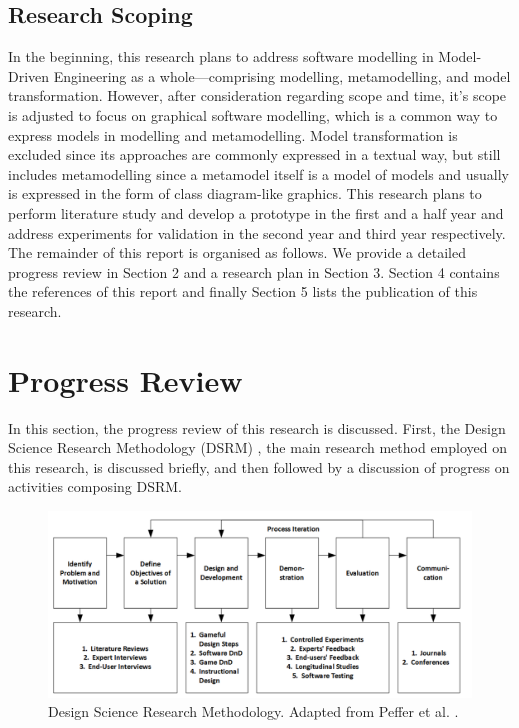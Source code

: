 \documentclass[12pt, a4paper]{report} \usepackage[titletoc]{appendix}
\begin{document}
\section{Research Scoping}
In the beginning, this research plans to address software modelling in Model-Driven Engineering as a whole---comprising modelling, metamodelling, and model transformation. However, after consideration regarding scope and time, it's scope is adjusted to focus on graphical software modelling, which is a common way to express models in modelling and metamodelling. Model transformation is excluded since its approaches are commonly expressed in a textual way, but still includes metamodelling since a metamodel itself is a model of models and usually is expressed in the form of class diagram-like graphics. This research plans to perform literature study and develop a prototype in the first and a half year and address experiments for validation in the second year and third year respectively.\newline\newline
The remainder of this report is organised as follows. We provide a detailed
progress review in Section 2 and a research plan in Section 3. Section 4 contains the references of this report and finally Section 5 lists the publication of this research.

\chapter{Progress Review}
\label{Progres Review}
In this section, the progress review of this research is discussed. First, the Design Science Research Methodology (DSRM) \cite{peffers2007design}, the main research method employed on this research, is discussed briefly, and then followed by a discussion of progress on activities composing DSRM.

\begin{figure}[ht] \centering \includegraphics[width=\textwidth]{dsrm}
\caption{Design Science Research Methodology. Adapted from Peffer et al. \cite{peffers2007design}.}
\label{dsrm}
\end{figure}
\end{document}
